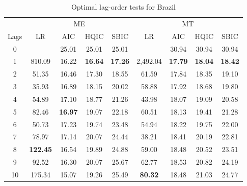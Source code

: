 \documentclass[a4paper, twoside]{templates/ociamthesis}
\begin{document}
\begin{table}[H]

\caption{\label{tab:TableC22}Optimal lag-order tests for Brazil}
\centering
\fontsize{10}{12}\selectfont
\begin{tabular}[t]{ccccccccc}
\toprule
\multicolumn{1}{c}{ } & \multicolumn{4}{c}{ME} & \multicolumn{4}{c}{MT} \\
\cmidrule(l{3pt}r{3pt}){2-5} \cmidrule(l{3pt}r{3pt}){6-9}
Lags & LR & AIC & HQIC & SBIC & LR & AIC & HQIC & SBIC\\
\midrule
0 &  & 25.01 & 25.01 & 25.01 &  & 30.94 & 30.94 & 30.94\\
1 & 810.09 & 16.22 & \textbf{16.64} & \textbf{17.26} & 2,492.04 & \textbf{17.79} & \textbf{18.04} & \textbf{18.42}\\
2 & 51.35 & 16.46 & 17.30 & 18.55 & 61.59 & 17.84 & 18.35 & 19.10\\
3 & 35.93 & 16.89 & 18.15 & 20.02 & 58.88 & 17.92 & 18.68 & 19.80\\
4 & 54.89 & 17.10 & 18.77 & 21.26 & 43.98 & 18.07 & 19.09 & 20.58\\
5 & 82.46 & \textbf{16.97} & 19.07 & 22.18 & 60.51 & 18.13 & 19.41 & 21.28\\
6 & 50.73 & 17.23 & 19.74 & 23.48 & 54.94 & 18.22 & 19.75 & 22.00\\
7 & 78.97 & 17.14 & 20.07 & 24.44 & 38.21 & 18.41 & 20.19 & 22.81\\
8 & \textbf{122.45} & 16.54 & 19.89 & 24.88 & 59.00 & 18.48 & 20.52 & 23.51\\
9 & 92.52 & 16.30 & 20.07 & 25.67 & 62.77 & 18.53 & 20.82 & 24.19\\
10 & 175.34 & 15.07 & 19.26 & 25.49 & \textbf{80.32} & 18.48 & 21.03 & 24.77\\
\bottomrule
\end{tabular}
\end{table}

\clearpage
\end{document}

